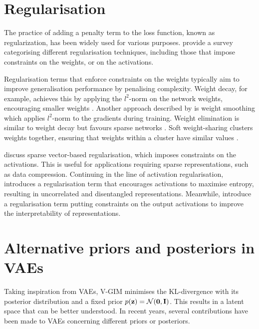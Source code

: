 	
	

\section{Regularisation}
	The practice of adding a penalty term to the loss function, known as regularization, has been widely used for various purposes. \cite{kukackaRegularizationDeepLearning2017} provide a survey categorising different regularisation techniques, including those that impose constraints on the weights, or on the activations.
	
	Regularisation terms that enforce constraints on the weights typically aim to improve generalisation performance by penalising complexity. Weight decay, for example, achieves this by applying the $l^2$-norm on the network weights, encouraging smaller weights \citep{gneccoWeightdecayTechniqueLearning2009}. Another approach described by \cite{kukackaRegularizationDeepLearning2017} is weight smoothing which applies $l^2$-norm to the gradients during training. Weight elimination is similar to weight decay but favours sparse networks \citep{weigendGeneralizationWeightEliminationApplication1990}. Soft weight-sharing clusters weights together, ensuring that weights within a cluster have similar values \citep{nowlanSimplifyingNeuralNetworks1992}.
	
	\cite{tianComprehensiveSurveyRegularization2022} discuss sparse vector-based regularisation, which imposes constraints on the activations. This is useful for applications requiring sparse representations, such as data compression. Continuing in the line of activation regularisation, \cite{tomczakLearningInformativeFeatures2016} introduces a regularisation term that encourages activations to maximise entropy, resulting in uncorrelated and disentangled representations. Meanwhile, \cite{wuImprovingInterpretabilityRegularization2018} introduce a regularisation term putting constraints on the output activations to improve the interpretability of representations.


\section{Alternative priors and posteriors in VAEs} \label{cha:rel_alt_priors}
	Taking inspiration from VAEs, V-GIM minimises the KL-divergence with its posterior distribution and a fixed prior $p(\mathbf{z})=\mathcal{N}(\bm{\mathbf{0}}, \mathbf{I})$. This results in a latent space that can be better understood. In recent years, several contributions have been made to VAEs concerning different priors or posteriors.
	
